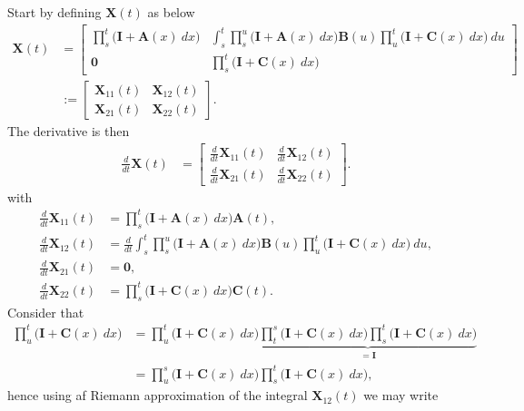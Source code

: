 \documentclass[a4paper,12pt,openany]{book}
\begin{document}
Start by defining \(\mathbf{X}(t)\) as below
\begin{align*}
\mathbf{X}(t)&=
\begin{bmatrix}
\prod_{s}^t\big(\mathbf{I}+\mathbf{A}(x)\ dx\big) & \int_s^t\prod_{s}^u\big(\mathbf{I}+\mathbf{A}(x)\ dx\big)\mathbf{B}(u)\prod_{u}^t\big(\mathbf{I}+\mathbf{C}(x)\ dx\big)\ du\\
\mathbf{0} & \prod_{s}^t\big(\mathbf{I}+\mathbf{C}(x)\ dx\big)
\end{bmatrix}\\
&:=\begin{bmatrix}
\mathbf{X}_{11}(t) & \mathbf{X}_{12}(t)\\
\mathbf{X}_{21}(t) & \mathbf{X}_{22}(t)
\end{bmatrix}.
\end{align*}
The derivative is then
\begin{align*}
\frac{d}{dt}\mathbf{X}(t)&=
\begin{bmatrix}
\frac{d}{dt}\mathbf{X}_{11}(t) & \frac{d}{dt}\mathbf{X}_{12}(t)\\
\frac{d}{dt}\mathbf{X}_{21}(t) & \frac{d}{dt}\mathbf{X}_{22}(t)
\end{bmatrix}.
\end{align*}
with
\begin{align*}
\frac{d}{dt}\mathbf{X}_{11}(t)&=\prod_{s}^t\big(\mathbf{I}+\mathbf{A}(x)\ dx\big)\mathbf{A}(t),\\
\frac{d}{dt}\mathbf{X}_{12}(t)&= \frac{d}{dt}\int_s^t\prod_{s}^u\big(\mathbf{I}+\mathbf{A}(x)\ dx\big)\mathbf{B}(u)\prod_{u}^t\big(\mathbf{I}+\mathbf{C}(x)\ dx\big)\ du,\\
\frac{d}{dt}\mathbf{X}_{21}(t)&=\mathbf{0},\\
\frac{d}{dt}\mathbf{X}_{22}(t)&=\prod_{s}^t\big(\mathbf{I}+\mathbf{C}(x)\ dx\big)\mathbf{C}(t).
\end{align*}
Consider that
\begin{align*}
\prod_{u}^t\big(\mathbf{I}+\mathbf{C}(x)\ dx\big)&=\prod_{u}^t\big(\mathbf{I}+\mathbf{C}(x)\ dx\big)\underbrace{\prod_{t}^s\big(\mathbf{I}+\mathbf{C}(x)\ dx\big)\prod_{s}^t\big(\mathbf{I}+\mathbf{C}(x)\ dx\big)}_{=\mathbf{I}}\\
&=\prod_{u}^s\big(\mathbf{I}+\mathbf{C}(x)\ dx\big)\prod_{s}^t\big(\mathbf{I}+\mathbf{C}(x)\ dx\big),
\end{align*}
hence using af Riemann approximation of the integral \(\mathbf{X}_{12}(t)\) we may write
\end{document}
